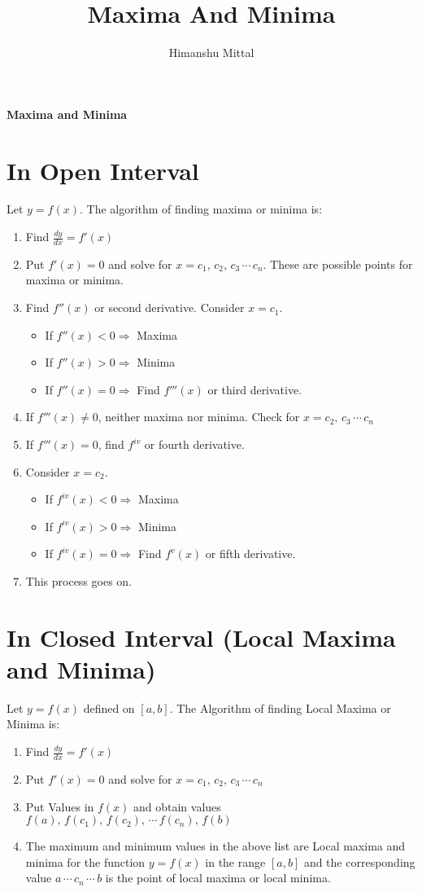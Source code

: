 \documentclass[11pt,a4paper,landscape]{article}
\author{Himanshu Mittal}
\title{Maxima And Minima}
\begin{document}
\begin{multicols*}{2}
{\noindent \bfseries {\Huge Maxima and Minima}}\\
\section{In Open Interval}
Let $y=f(x)$. The algorithm of finding maxima or minima is:
\renewcommand{\theenumi}{\Roman{enumi}}%
\begin{enumerate}
\item Find $\displaystyle{\frac{dy}{dx} = f'(x)}$
\item Put $f'(x)=0$ and solve for $x=c_1,\,c_2,\,c_3\,\cdots\,c_n$. These are possible points for maxima or minima.
\item Find $f''(x)$ or second derivative. Consider $x=c_1$.
	\begin{itemize}
	\item If $f''(x) < 0\Rightarrow$  Maxima
	\item If $f''(x) > 0\Rightarrow$  Minima
	\item If $f''(x) = 0\Rightarrow$  Find $f'''(x)$ or third derivative.
	\end{itemize}
\item If $f'''(x) \neq 0$, neither maxima nor minima. Check for $x=c_2,\,c_3\,\cdots\,c_n$
\item If $f'''(x) = 0$, find $f^{iv}$ or fourth derivative.
\item Consider $x=c_2$.
	\begin{itemize}
	\item If $f^{iv}(x) < 0\Rightarrow$  Maxima
	\item If $f^{iv}(x) > 0\Rightarrow$  Minima
	\item If $f^{iv}(x) = 0\Rightarrow$  Find $f^{v}(x)$ or fifth derivative.
	\end{itemize}
\item This process goes on.
\end{enumerate}

\vfill\null
\columnbreak

\section{In Closed Interval (Local Maxima and Minima)}

Let $y=f(x)$ defined on $[a, b]$. The Algorithm of finding Local Maxima or Minima is:
\renewcommand{\theenumi}{\Roman{enumi}}%
\begin{enumerate}
\item Find $\displaystyle{\frac{dy}{dx} = f'(x)}$
\item Put $f'(x)=0$ and solve for $x=c_1,\,c_2,\,c_3\,\cdots\,c_n$
\item Put Values in $f(x)$ and obtain values $f(a),\,f(c_1),\,f(c_2),\,\cdots\,f(c_n),\,f(b)$
\item The maximum and minimum values in the above list are Local maxima and minima for the function $y=f(x)$ in the range $[a,b]$ and the corresponding value $a\,\cdots\,c_n\,\cdots\,b$ is the point of local maxima or local minima.
\end{enumerate}
\end{multicols*}
\end{document}
